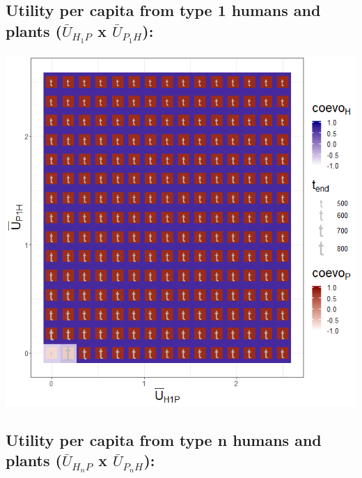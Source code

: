 \documentclass[]{book}
\begin{document}
\newpage

\hypertarget{utility-per-capita-from-type-1-humans-and-plants-baru_h_1p-x-baru_p_1h}{%
\subsection{\texorpdfstring{Utility per capita from type 1 humans and plants (\(\bar{U}_{H_{1}P}\) x \(\bar{U}_{P_{1}H}\)):}{Utility per capita from type 1 humans and plants (\textbackslash{}bar\{U\}\_\{H\_\{1\}P\} x \textbackslash{}bar\{U\}\_\{P\_\{1\}H\}):}}\label{utility-per-capita-from-type-1-humans-and-plants-baru_h_1p-x-baru_p_1h}}

\includegraphics[width=1\linewidth]{plots/3_twoPar-mU.H1P-mU.P1H_plot}

\newpage

\hypertarget{utility-per-capita-from-type-n-humans-and-plants-baru_h_np-x-baru_p_nh-1}{%
\subsection{\texorpdfstring{Utility per capita from type n humans and plants (\(\bar{U}_{H_{n}P}\) x \(\bar{U}_{P_{n}H}\)):}{Utility per capita from type n humans and plants (\textbackslash{}bar\{U\}\_\{H\_\{n\}P\} x \textbackslash{}bar\{U\}\_\{P\_\{n\}H\}):}}\label{utility-per-capita-from-type-n-humans-and-plants-baru_h_np-x-baru_p_nh-1}}
\end{document}

